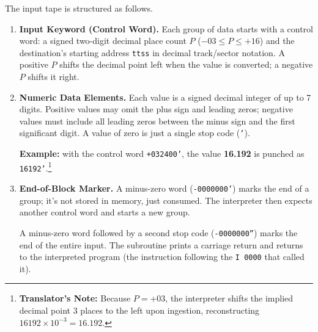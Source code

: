 The input tape is structured as follows.
\begin{enumerate}[label=\alph*)]
\item \textbf{Input Keyword (Control Word).}
Each group of data starts with a control word: a signed two-digit decimal place count $P$ ($-03 \le P \le +16$) and the destination's starting address \texttt{ttss} in decimal track/sector notation. A positive $P$ shifts the decimal point left when the value is converted; a negative $P$ shifts it right.

\item \textbf{Numeric Data Elements.}
Each value is a signed decimal integer of up to 7 digits. Positive values may omit the plus sign and leading zeros; negative values must include all leading zeros between the minus sign and the first significant digit. A value of zero is just a single stop code (\texttt{'}).

\medskip
\textbf{Example:} with the control word \texttt{+032400'}, the value \textbf{16.192} is punched as \texttt{16192'}.\footnote{\textbf{Translator's Note:} Because $P = +03$, the interpreter shifts the implied decimal point 3 places to the left upon ingestion, reconstructing $16192 \times 10^{-3} = 16.192$.}

\item \textbf{End-of-Block Marker.}
A minus-zero word (\texttt{-0000000'}) marks the end of a group; it's not stored in memory, just consumed. The interpreter then expects another control word and starts a new group.

A minus-zero word followed by a second stop code (\texttt{-0000000''}) marks the end of the entire input. The subroutine prints a carriage return and returns to the interpreted program (the instruction following the \texttt{I 0000} that called it).


\end{enumerate}
